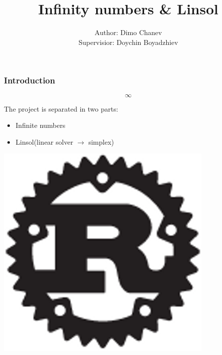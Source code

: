 \documentclass[12pt]{beamer}
\begin{document}
	
	\author[Dimo]{
		\begin{table}[]
			\begin{tabular}{rl}
				\normalsize{Author:    } & \normalsize{Dimo Chanev} \\
				\scriptsize{Supervisior:     } & \scriptsize{Doychin Boyadzhiev}
			\end{tabular}
		\end{table}
	}
	\title[Infinity numbers \& Linsol]{\textbf{Infinity numbers \& Linsol}}
	
	\begin{frame}
		\titlepage
	\end{frame}

	\begin{frame}
		\frametitle{Introduction}
		\begin{center}
			\Huge{$$\infty$$}
		\end{center}
		\begin{block}{}
			The project is separated in two parts:
            \begin{itemize}
            \item Infinite numbers
            \item Linsol(linear solver $\to$ simplex)
            \end{itemize}
		\end{block}
		\vspace{0.1cm}
		\begin{center}
			\includegraphics[scale=0.1]{rust.png}
		\end{center}
		\vspace{1.1cm}
	\end{frame}
\end{document}
